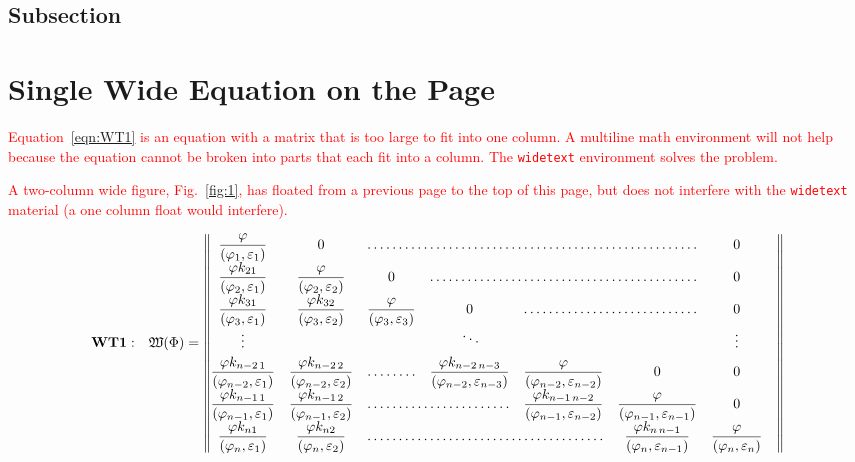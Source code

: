 \lipsum[4]
\subsection{Subsection}
\lipsum[5-6]

\section{Single Wide Equation on the Page}

\textcolor{red}{Equation~\eqref{eqn:WT1} is an equation with a matrix that is too large to fit into one column. A multiline math environment will not help because the equation cannot be broken into parts that each fit into a column. The \texttt{widetext} environment solves the problem.}  

\textcolor{red}{A two-column wide figure, Fig.~\ref{fig:1}, has floated from a previous page to the top of this page, but does not interfere with the \texttt{widetext} material (a one column float would interfere).}

\begin{widetext}
\begin{equation}\label{eqn:WT1}
\mathbf{WT1:}\quad
\mathfrak{W}(\bm{\Phi})= \begin{Vmatrix}
\dfrac\varphi{(\varphi_1,\varepsilon_1)}			& 0 												& \hdotsfor{4} 	& 0 			&	\\[\jot]
\dfrac{\varphi k_{21}}{(\varphi_2,\varepsilon_1)}	& \dfrac\varphi{(\varphi_2,\varepsilon_2)}			& 0 			& \hdotsfor{3} 	& 0 \\[\jot]
\dfrac{\varphi k_{31}}{(\varphi_3,\varepsilon_1)}	&\dfrac{\varphi k_{32}}{(\varphi_3,\varepsilon_2)}	& \dfrac\varphi{(\varphi_3,\varepsilon_3)}& 0 & \hdotsfor{2} & 0 \\[\jot]
\vdots 	&  &  & \smash{\rotatebox{15}{$\ddots$}} &  & & \vdots \\[\jot]
\dfrac{\varphi k_{n-2\, 1}}{(\varphi_{n-2},\varepsilon_1)}	&
\dfrac{\varphi k_{n-2\, 2}}{(\varphi_{n-2},\varepsilon_2)}	&\hdotsfor{1} & \dfrac{\varphi k_{n-2\,n-3}}{(\varphi_{n-2},\varepsilon_{n-3})} & \dfrac\varphi{(\varphi_{n-2},\varepsilon_{n-2})}& 0& 0 \\[\jot]
\dfrac{\varphi k_{n-1\, 1}}{(\varphi_{n-1},\varepsilon_1)}	& \dfrac{\varphi k_{n-1\, 2}}{(\varphi_{n-1},\varepsilon_2)} &\hdotsfor{2} & 
\dfrac{\varphi k_{n-1\,n-2}}{(\varphi_{n-1},\varepsilon_{n-2})}& \dfrac{\varphi}{(\varphi_{n-1},\varepsilon_{n-1})} & 0 \\[\jot]
\dfrac{\varphi k_{n1}}{(\varphi_n,\varepsilon_1)}	& \dfrac{\varphi k_{n2}}{(\varphi_n,\varepsilon_2)}	& \hdotsfor{3}	&
\dfrac{\varphi k_{n\,n-1}}{(\varphi_n,\varepsilon_{n-1})} & \dfrac{\varphi}{(\varphi_n,\varepsilon_n)}
\end{Vmatrix}
\end{equation}
\end{widetext}

